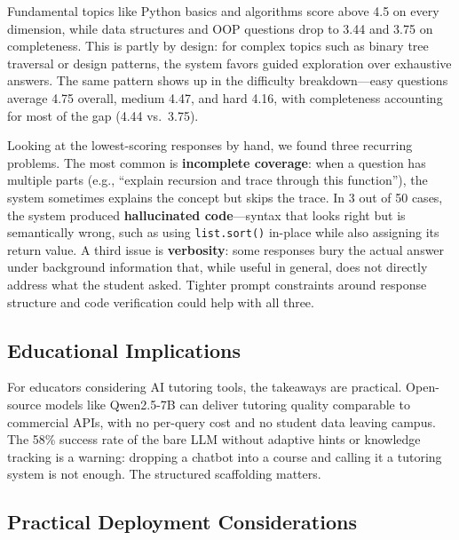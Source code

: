 \documentclass[applsci,article,submit,pdftex,moreauthors]{Definitions/mdpi}
\begin{document}
Fundamental topics like Python basics and algorithms score above 4.5 on every dimension, while data structures and OOP questions drop to 3.44 and 3.75 on completeness. This is partly by design: for complex topics such as binary tree traversal or design patterns, the system favors guided exploration over exhaustive answers. The same pattern shows up in the difficulty breakdown---easy questions average 4.75 overall, medium 4.47, and hard 4.16, with completeness accounting for most of the gap (4.44 vs.\ 3.75).

Looking at the lowest-scoring responses by hand, we found three recurring problems. The most common is \textbf{incomplete coverage}: when a question has multiple parts (e.g., ``explain recursion and trace through this function''), the system sometimes explains the concept but skips the trace. In 3 out of 50 cases, the system produced \textbf{hallucinated code}---syntax that looks right but is semantically wrong, such as using \texttt{list.sort()} in-place while also assigning its return value. A third issue is \textbf{verbosity}: some responses bury the actual answer under background information that, while useful in general, does not directly address what the student asked. Tighter prompt constraints around response structure and code verification could help with all three.

\subsection{Educational Implications}

For educators considering AI tutoring tools, the takeaways are practical. Open-source models like Qwen2.5-7B can deliver tutoring quality comparable to commercial APIs, with no per-query cost and no student data leaving campus. The 58\% success rate of the bare LLM without adaptive hints or knowledge tracking is a warning: dropping a chatbot into a course and calling it a tutoring system is not enough. The structured scaffolding matters.

\subsection{Practical Deployment Considerations}
\end{document}
